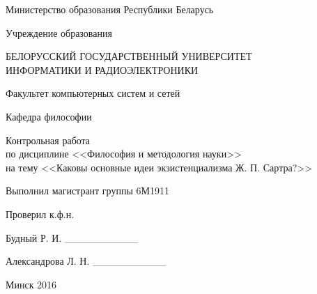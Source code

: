 \begin{titlepage}
\thispagestyle{empty}
\setlength{\parindent}{0cm} %

{\centering{}
  Министерство образования Республики Беларусь

  \smallskip
  Учреждение образования

  БЕЛОРУССКИЙ ГОСУДАРСТВЕННЫЙ УНИВЕРСИТЕТ \\
  ИНФОРМАТИКИ И РАДИОЭЛЕКТРОНИКИ

  \smallskip
  Факультет компьютерных систем и сетей

  \smallskip
  Кафедра философии\par
}

\vspace{50mm}

{\centering{}
  Контрольная работа \\
  по дисциплине <<Философия и методология науки>> \\
  на тему <<Каковы основные идеи экзистенциализма Ж. П. Сартра?>>\par
}

\vspace{50mm}

\begin{minipage}{.52\linewidth}
  Выполнил магистрант группы 6М1911

  \smallskip
  Проверил к.ф.н.
\end{minipage}
\hfill
\begin{minipage}{.47\linewidth}
  \begin{flushright}
    Будный Р. И. \_\_\_\_\_\_\_\_\_\_

    \smallskip
    Александрова Л. Н. \_\_\_\_\_\_\_\_\_\_
  \end{flushright}
\end{minipage}

\vfill
{\centering{}
  Минск 2016\par
}

\setlength{\parindent}{1.25cm} %
\end{titlepage}
